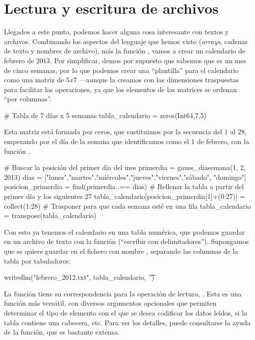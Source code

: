 \section{Lectura y escritura de archivos}

Llegados a este punto, podemos hacer alguna cosa interesante con textos y archivos. Combinando los aspectos del lenguaje que hemos visto (\emph{arrays}, cadenas de texto y nombres de archivo), más la función , vamos a crear un calendario de febrero de 2013. Por simplificar, demos por supuesto que sabemos que es un mes de cinco semanas, por lo que podemos crear una ``plantilla'' para el calendario como una matriz de $5x7$ ---aunque la creamos con las dimensiones traspuestas para facilitar las operaciones, ya que los elementos de las matrices se ordenan ``por columnas''.

\begin{juliacode}
# Tabla de 7 días x 5 semanas
tabla_calendario = zeros(Int64,7,5)
\end{juliacode}

Esta matriz está formada por ceros, que sustituimos por la secuencia del $1$ al $28$, empezando por el día de la semana que identificamos como el 1 de febrero, con la función .

\begin{juliacode}
# Buscar la posición del primer día del mes
primerdia = gauss_diasemana(1, 2, 2013)
dias = ["lunes","martes","miércoles","jueves","viernes","sábado", "domingo"]
posicion_primerdia = find(primerdia .== dias)
# Rellenar la tabla a partir del primer día y los siguientes 27
tabla_calendario[posicion_primerdia[1]+(0:27)] = collect(1:28)
# Trasponer para que cada semana esté en una fila
tabla_calendario = transpose(tabla_calendario)
\end{juliacode}

Con esto ya tenemos el calendario en una tabla numérica, que podemos guardar en un archivo de texto con la función  (``escribir con delimitadores''). Supongamos que se quiere guardar en el fichero con nombre , separando las columnas de la tabla por tabuladores:

\begin{juliacode}
writedlm("febrero_2012.txt", tabla_calendario, '\t')
\end{juliacode}

La función  tiene su correspondencia para la operación de lectura, . Esta es una función más versátil, con diversos argumentos opcionales que permiten determinar el tipo de elemento con el que se desea codificar los datos leídos, si la tabla contiene una cabecera, etc. Para ver los detalles, puede consultarse la ayuda de la función, que es bastante extensa.


